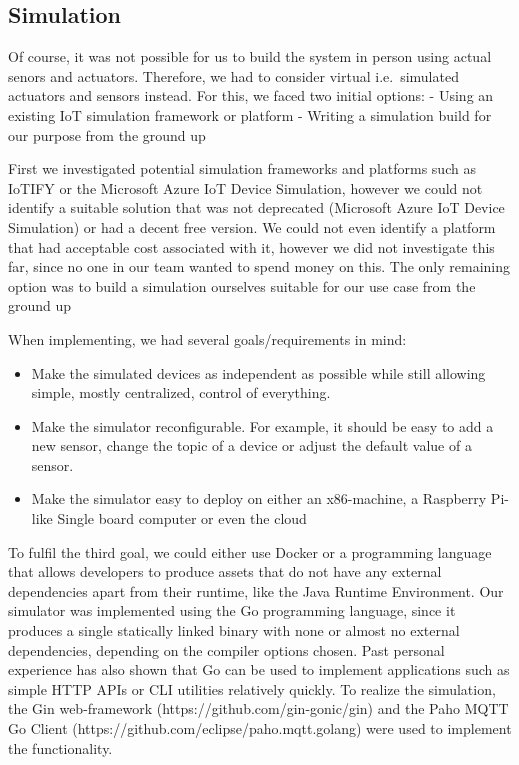 \subsection{Simulation}
\label{simulation}

Of course, it was not possible for us to build the system in person
using actual senors and actuators. Therefore, we had to consider virtual
i.e.~simulated actuators and sensors instead. For this, we faced two
initial options: - Using an existing IoT simulation framework or
platform - Writing a simulation build for our purpose from the ground up

First we investigated potential simulation frameworks and platforms such
as IoTIFY or the Microsoft Azure IoT Device Simulation, however we could
not identify a suitable solution that was not deprecated (Microsoft
Azure IoT Device Simulation) or had a decent free version. We could not
even identify a platform that had acceptable cost associated with it,
however we did not investigate this far, since no one in our team wanted
to spend money on this. The only remaining option was to build a
simulation ourselves suitable for our use case from the ground up

When implementing, we had several goals/requirements in mind:

\begin{itemize}
    \item
    Make the simulated devices as independent as possible while still
    allowing simple, mostly centralized, control of everything.
    \item
    Make the simulator reconfigurable. For example, it should be easy to
    add a new sensor, change the topic of a device or adjust the default
    value of a sensor.
    \item
    Make the simulator easy to deploy on either an x86-machine, a
    Raspberry Pi-like Single board computer or even the cloud
\end{itemize}

To fulfil the third goal, we could either use Docker or a programming
language that allows developers to produce assets that do not have any
external dependencies apart from their runtime, like the Java Runtime
Environment. Our simulator was implemented using the Go programming
language, since it produces a single statically linked binary with none
or almost no external dependencies, depending on the compiler options
chosen. Past personal experience has also shown that Go can be used to
implement applications such as simple HTTP APIs or CLI utilities
relatively quickly. To realize the simulation, the Gin web-framework
(https://github.com/gin-gonic/gin) and the Paho MQTT Go Client
(https://github.com/eclipse/paho.mqtt.golang) were used to implement the
functionality.

